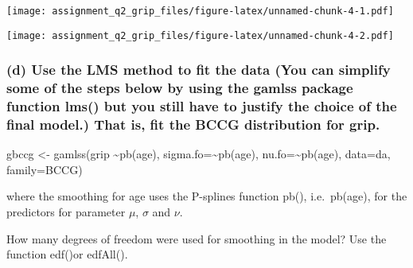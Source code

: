 \documentclass[
]{article}
\newenvironment{Shaded}{\begin{snugshade}}{\end{snugshade}}
\newcommand{\AttributeTok}[1]{\textcolor[rgb]{0.77,0.63,0.00}{#1}}
\newcommand{\CommentTok}[1]{\textcolor[rgb]{0.56,0.35,0.01}{\textit{#1}}}
\newcommand{\DecValTok}[1]{\textcolor[rgb]{0.00,0.00,0.81}{#1}}
\newcommand{\FunctionTok}[1]{\textcolor[rgb]{0.00,0.00,0.00}{#1}}
\newcommand{\NormalTok}[1]{#1}
\newcommand{\SpecialCharTok}[1]{\textcolor[rgb]{0.00,0.00,0.00}{#1}}
\newcommand{\StringTok}[1]{\textcolor[rgb]{0.31,0.60,0.02}{#1}}
\begin{document}
\texttt{[image: assignment\_q2\_grip\_files/figure-latex/unnamed-chunk-4-1.pdf]}

\begin{Shaded}
\end{Shaded}

\texttt{[image: assignment\_q2\_grip\_files/figure-latex/unnamed-chunk-4-2.pdf]}

\hypertarget{d-use-the-lms-method-to-fit-the-data-you-can-simplify-some-of-the-steps-below-by-using-the-gamlss-package-function-lms-but-you-still-have-to-justify-the-choice-of-the-final-model.-that-is-fit-the-bccg-distribution-for-grip.}{%
\subsubsection{(d) Use the LMS method to fit the data (You can simplify
some of the steps below by using the gamlss package function lms() but
you still have to justify the choice of the final model.) That is, fit
the BCCG distribution for
grip.}\label{d-use-the-lms-method-to-fit-the-data-you-can-simplify-some-of-the-steps-below-by-using-the-gamlss-package-function-lms-but-you-still-have-to-justify-the-choice-of-the-final-model.-that-is-fit-the-bccg-distribution-for-grip.}}

gbccg \textless- gamlss(grip \textasciitilde pb(age),
sigma.fo=\textasciitilde pb(age), nu.fo=\textasciitilde pb(age),
data=da, family=BCCG)

where the smoothing for age uses the P-splines function pb(),
i.e.~pb(age), for the predictors for parameter \(\mu\), \(\sigma\) and
\(\nu\).

How many degrees of freedom were used for smoothing in the model? Use
the function edf()or edfAll().
\end{document}

